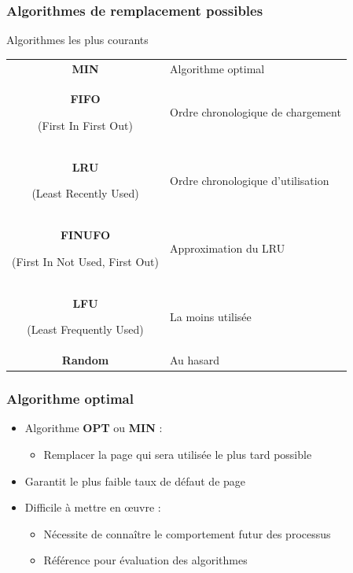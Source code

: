 \begin{frame}
\frametitle{Algorithmes de remplacement possibles}
\begin{block}{Algorithmes les plus courants}
\begin{tabular}{c|l}
\textbf{MIN} & Algorithme optimal \\
\textbf{FIFO} \begin{tiny}(First In First Out)\end{tiny}& Ordre chronologique de chargement \\
\textbf{LRU} \begin{tiny}(Least Recently Used)\end{tiny} & Ordre chronologique d'utilisation \\
\textbf{FINUFO} \begin{tiny}(First In Not Used, First Out)\end{tiny} & Approximation du LRU \\
\textbf{LFU} \begin{tiny}(Least Frequently Used)\end{tiny} & La moins utilisée \\
\textbf{Random} & Au hasard \\
\end{tabular}
\end{block}
\end{frame}


\begin{frame}
\frametitle{Algorithme optimal}
\begin{itemize}
\item Algorithme \textbf{OPT} ou \textbf{MIN} :
\begin{itemize}
\item Remplacer la page qui sera utilisée le plus tard possible
\end{itemize}
\item Garantit le plus faible taux de défaut de page
\item Difficile à mettre en œuvre :
\begin{itemize}
\item Nécessite de connaître le comportement futur des processus
\item Référence pour évaluation des algorithmes
\end{itemize}
\end{itemize}
\end{frame}


